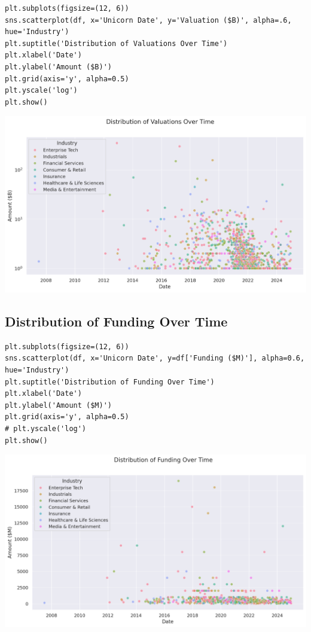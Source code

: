 \documentclass[a4paper,12pt]{article}
\begin{document}
\begin{verbatim}
plt.subplots(figsize=(12, 6))
sns.scatterplot(df, x='Unicorn Date', y='Valuation ($B)', alpha=.6, hue='Industry')
plt.suptitle('Distribution of Valuations Over Time')
plt.xlabel('Date')
plt.ylabel('Amount ($B)')
plt.grid(axis='y', alpha=0.5)
plt.yscale('log')
plt.show()
\end{verbatim}

\begin{center}
\includegraphics[width=.9\linewidth]{./.ob-jupyter/3952b0ffe7cc6297ac4c314ed80d5b934e4dd585.png}
\label{}
\end{center}
\subsection{Distribution of Funding Over Time}
\label{sec:orgfb1a90d}

\begin{verbatim}
plt.subplots(figsize=(12, 6))
sns.scatterplot(df, x='Unicorn Date', y=df['Funding ($M)'], alpha=0.6, hue='Industry')
plt.suptitle('Distribution of Funding Over Time')
plt.xlabel('Date')
plt.ylabel('Amount ($M)')
plt.grid(axis='y', alpha=0.5)
# plt.yscale('log')
plt.show()
\end{verbatim}

\begin{center}
\includegraphics[width=.9\linewidth]{./.ob-jupyter/a358841530629a3897fd535343447d3cbaf3a4bb.png}
\label{}
\end{center}
\end{document}
